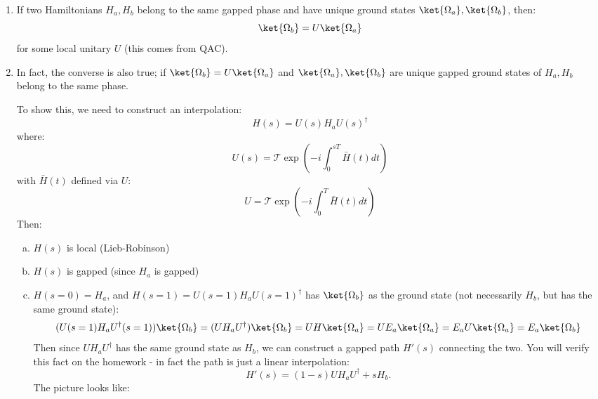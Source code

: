 \begin{enumerate}
    \item If two Hamiltonians $H_a, H_b$ belong to the same gapped phase and have unique ground states $\ket{\Omega_a}, \ket{\Omega_b}$, then:
    \begin{equation}
        \ket{\Omega_b} = U\ket{\Omega_a}
    \end{equation}
    for some local unitary $U$ (this comes from QAC).
    \item In fact, the converse is also true; if $\ket{\Omega_b} = U\ket{\Omega_a}$ and $\ket{\Omega_a}, \ket{\Omega_b}$ are unique gapped ground states of $H_a, H_b$ belong to the same phase.

    To show this, we need to construct an interpolation:
    \begin{equation}
        H(s) = U(s)H_aU(s)^\dag
    \end{equation}
    where:
    \begin{equation}
        U(s) = \mathcal{T}\exp(-i\int_0^{sT} \bar{H}(t)dt)
    \end{equation}
    with $\bar{H}(t)$ defined via $U$:
    \begin{equation}
        U = \mathcal{T}\exp(-i\int_0^{T} \bar{H}(t)dt)
    \end{equation}
    Then:
    \begin{enumerate}[(a)]
        \item $H(s)$ is local (Lieb-Robinson)
        \item $H(s)$ is gapped (since $H_a$ is gapped)
        \item $H(s = 0) = H_a$, and $H(s = 1) = U(s=1)H_aU(s=1)^\dag$ has $\ket{\Omega_b}$ as the ground state (not necessarily $H_b$, but has the same ground state):
        \begin{equation}
            (U(s=1)H_aU^\dag(s=1))\ket{\Omega_b} = (UH_aU^\dag)\ket{\Omega_b} = UH\ket{\Omega_a} = UE_a\ket{\Omega_a} = E_aU\ket{\Omega_a} = E_a\ket{\Omega_b}
        \end{equation}
        Then since $UH_aU^\dag$ has the same ground state as $H_b$, we can construct a gapped path $H'(s)$ connecting the two. You will verify this fact on the homework - in fact the path is just a linear interpolation:
        \begin{equation}
            H'(s) = (1-s)U H_a U^\dag + s H_b.
        \end{equation}
        The picture looks like:
        \begin{center}

\end{center}
\end{enumerate}
\end{enumerate}
